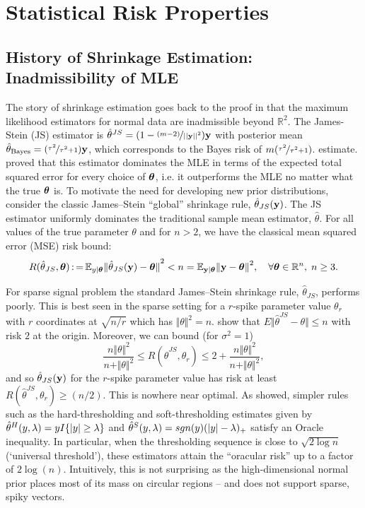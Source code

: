 \documentclass[11pt]{article}
\begin{document}
\section{Statistical Risk Properties}\label{sec:stat-prop}

\subsection{History of Shrinkage Estimation: Inadmissibility of MLE} 
The story of shrinkage estimation goes back to the proof in
\citet{stein_inadmissibility_1956} that the maximum likelihood estimators for
normal data are inadmissible beyond $\mathbb{R}^2$. The James-Stein (JS) estimator
is $\hat{\theta}^{JS} = (1 - \nicefrac{(m-2)}{\left|\left|{\bf y}\right|\right|^2}){\bf y}$ with
posterior mean $\hat{\theta}_{\mathrm{Bayes}} = (\nicefrac{\tau^2}{\tau^2+1})
{\bf y}$, which corresponds to the Bayes risk of $m(\nicefrac{\tau^2}{\tau^2+1})$.
estimate. 
\citet{james_estimation_1961} proved that this estimator dominates the MLE in
terms of the expected total squared error for every choice of $\boldsymbol{\theta}$, i.e.
it outperforms the MLE no matter what the true $\boldsymbol{\theta}$ is. To motivate the
need for developing new prior distributions, consider the classic James--Stein
``global'' shrinkage rule, ${\hat{\theta}}_{JS}{}({\bf y})$. The JS estimator uniformly dominates the
traditional sample mean estimator, $\hat{\theta}$. For all values of the true
parameter $\theta$ and for $n>2$, we have the classical mean squared error
(MSE) risk bound:
\[ 
  R({\hat{\theta}}_{JS}{}, \boldsymbol{\theta}) \operatorname{:=} \mathbb E_{y \mid \boldsymbol{\theta}} {\Vert {\hat{\theta}}_{JS}{}({\bf y}) - \boldsymbol{\theta}
  \Vert}^2 < n = \mathbb E_{{\bf y} \mid \boldsymbol{\theta}} {\Vert {\bf y} - \boldsymbol{\theta} \Vert}^2, \quad
  \forall \boldsymbol{\theta} \in \mathbb{R}^n, \; n \ge 3.  
\]

For sparse signal problem the standard James--Stein shrinkage rule, $
\hat{\theta}_{JS} $, performs poorly. This is best seen in the sparse setting
for a $r$-spike parameter value $ \theta_r$ with $r$ coordinates at $
\sqrt{n/r} $ which has $ \Vert \theta \Vert^2 =n $.
\citet{johnstone2004needles} show that $ E \Vert \hat{\theta}^{JS} - \theta
\Vert \leq n $ with risk $2$ at the origin. Moreover, we can bound (for $\sigma^2 = 1$)
\[
  \frac{n \Vert \theta \Vert^2}{ n + \Vert \theta \Vert^2} \leq R \left (
  \hat{\theta}^{JS} , \theta_r \right ) \leq 2 + \frac{n \Vert \theta \Vert^2}{ n
  + \Vert \theta \Vert^2},
\]
and so ${\hat{\theta}}_{JS}{}({\bf y})$ for the $r$-spike parameter value has risk at least $ R
\left( \hat{\theta}^{JS} , \theta_r \right) \geq (n/2)$. This is nowhere near
optimal. As \citet{donoho1994ideal} showed, simpler rules such as the
hard-thresholding and soft-thresholding estimates given by
$\hat{\theta}^{H}(y,\lambda) = y I\{\lvert y\rvert \ge \lambda \}$ and
$\hat{\theta}^{S}(y,\lambda) = sgn(y) (\lvert y\rvert - \lambda)_{+}$ satisfy an
Oracle inequality. In particular, when the thresholding sequence is close to
$\sqrt{2\log n}$ (`universal threshold'), these estimators attain the
``oracular risk'' up to a factor of $2\log(n)$. Intuitively, this is not
surprising as the high-dimensional normal prior places most of its mass on
circular regions -- and does not support sparse, spiky vectors. 
\end{document}
